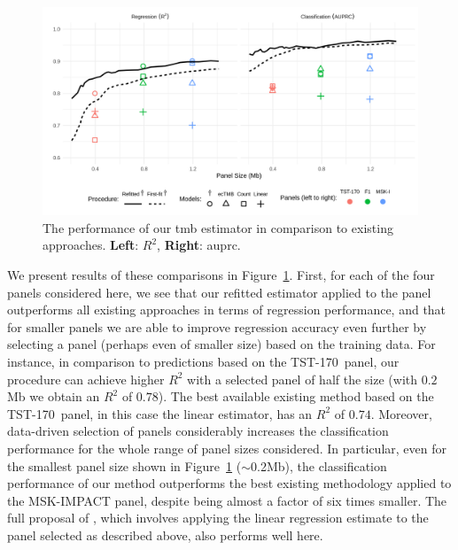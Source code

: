 \documentclass[../thesis.tex]{subfiles}
\begin{document}
\begin{figure}[htbp]
\centering
\includegraphics[width=6in]{../figures/chapter3/fig7.png}
\vspace*{-5mm}
\caption{The performance of our \gls{tmb} estimator in comparison to existing approaches. \textbf{Left}: $R^2$, \textbf{Right}: \gls{auprc}. \label{fig:commercial_comparison}}
\vspace*{-2mm}
\end{figure}

We present results of these comparisons in  Figure~\ref{fig:commercial_comparison}. First, for each of the {four} panels considered here, we see that our refitted estimator applied to the panel outperforms all existing approaches in terms of regression performance, and that for smaller panels we are able to improve regression accuracy even further by selecting a panel {(perhaps even of smaller size)} based on the training data. {For instance, in comparison to predictions based on the TST-170~panel, our procedure can achieve higher $R^2$ with a selected panel of half the size (with $0.2$Mb we obtain an $R^2$ of $0.78$).}
The best available existing method based on the TST-170~panel, in this case the linear estimator, has an $R^2$ of $0.74$. Moreover, data-driven selection of panels considerably increases the classification performance for the whole range of panel sizes considered. In particular, even for the smallest panel size shown in Figure~\ref{fig:commercial_comparison} ($\sim$0.2Mb), the classification performance of our method outperforms the best existing methodology applied to the MSK-IMPACT panel, despite being almost a factor of six times smaller. {The full proposal of \citet{lyu_mutation_2018}, which involves applying the linear regression estimate to the panel selected as described above, also performs well here.}      
\end{document}
